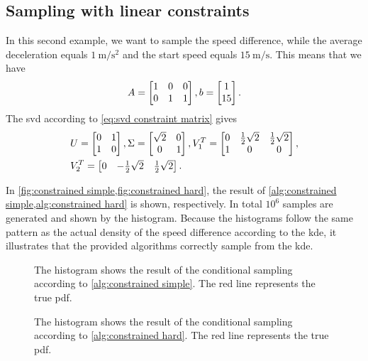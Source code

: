 \subsection{Sampling with linear constraints}

In this second example, we want to sample the speed difference, while the average deceleration equals $\SI{1}{\meter\per\second\squared}$ and the start speed equals $\SI{15}{\meter\per\second}$. 
This means that we have
\begin{equation*}
	A = \begin{bmatrix} 1 & 0 & 0 \\ 0 & 1 & 1 \end{bmatrix}, 
	b = \begin{bmatrix} 1 \\ 15 \end{bmatrix}.
\end{equation*}
The \ac{svd} according to \cref{eq:svd constraint matrix} gives
\begin{align*}
	&U = \begin{bmatrix} 0 & 1 \\ 1 & 0 \end{bmatrix},
	\Sigma = \begin{bmatrix} \sqrt{2} & 0 \\ 0 & 1 \end{bmatrix}, 
	V_1^T = \begin{bmatrix} 0 & \frac{1}{2}\sqrt{2} & \frac{1}{2}\sqrt{2} \\ 1 & 0 & 0 \end{bmatrix},\\
	&V_2^T = \begin{bmatrix} 0 & -\frac{1}{2}\sqrt{2} & \frac{1}{2}\sqrt{2} \end{bmatrix}.
\end{align*}

In \cref{fig:constrained simple,fig:constrained hard}, the result of \cref{alg:constrained simple,alg:constrained hard} is shown, respectively. 
In total $10^6$ samples are generated and shown by the histogram. 
Because the histograms follow the same pattern as the actual density of the speed difference according to the \ac{kde}, it illustrates that the provided algorithms correctly sample from the \ac{kde}. 

\begin{figure}
	\centering
	\resizebox{\columnwidth}{!}{%
		
	}
	\caption{The histogram shows the result of the conditional sampling according to \cref{alg:constrained simple}. The red line represents the true \ac{pdf}.}
	\label{fig:constrained simple}
\end{figure}

\begin{figure}
	\centering
	\resizebox{\columnwidth}{!}{%
		
	}
	\caption{The histogram shows the result of the conditional sampling according to \cref{alg:constrained hard}. The red line represents the true \ac{pdf}.}
	\label{fig:constrained hard}
\end{figure}
